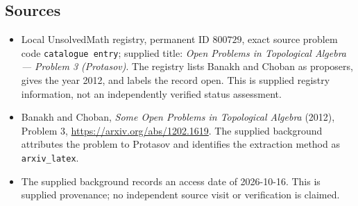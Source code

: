 \documentclass[11pt]{article}
\begin{document}
\subsection{Sources}
\begin{itemize}
\item Local UnsolvedMath registry, permanent ID \(800729\), exact source problem code \texttt{catalogue entry}; supplied title: \emph{Open Problems in Topological Algebra --- Problem 3 (Protasov)}. The registry lists Banakh and Choban as proposers, gives the year 2012, and labels the record open. This is supplied registry information, not an independently verified status assessment.
\item Banakh and Choban, \emph{Some Open Problems in Topological Algebra} (2012), Problem 3, \url{https://arxiv.org/abs/1202.1619}. The supplied background attributes the problem to Protasov and identifies the extraction method as \texttt{arxiv\_latex}.
\item The supplied background records an access date of 2026-10-16. This is supplied provenance; no independent source visit or verification is claimed.
\end{itemize}
\end{document}
